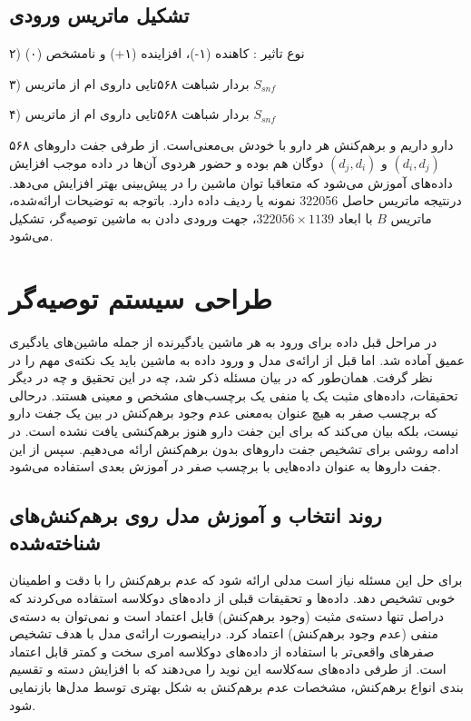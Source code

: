 \subsection{تشکیل ماتریس ورودی}

۲) نوع تاثیر : کاهنده (۱-)، افزاینده (۱+) و نامشخص (۰)

۳) بردار شباهت ۵۶۸تایی داروی
ام از ماتریس
$S_{snf}$

۴) بردار شباهت ۵۶۸تایی داروی
ام از ماتریس
$S_{snf}$

۵۶۸ دارو داریم و برهم‌کنش هر دارو با خودش بی‌معنی‌است. از طرفی جفت داروهای 
$(d_i, d_j)$
و 
$(d_j, d_i)$
دوگان هم بوده و حضور هردوی آن‌ها در داده موجب افزایش داده‌های آموزش می‌شود که متعاقبا توان ماشین را در پیش‌بینی بهتر افزایش می‌دهد. درنتیجه ماتریس حاصل 322056 نمونه یا ردیف داده دارد. باتوجه به توضیحات ارائه‌شده، ماتریس 
$B$
با ابعاد 
$322056 \times 1139$،
جهت ورودی دادن به ماشین توصیه‌گر، تشکیل می‌شود.


\section{
طراحی سیستم توصیه‌گر
\label{RecomDesign}}

در مراحل قبل داده برای ورود به هر ماشین یادگیرنده از جمله ماشین‌های یادگیری عمیق آماده شد. اما قبل از ارائه‌ی مدل و ورود داده به ماشین باید یک نکته‌ی مهم را در نظر گرفت. همان‌طور که در بیان مسئله ذکر شد، چه در این تحقیق و چه در دیگر تحقیقات، داده‌های مثبت یک یا منفی یک برچسب‌های مشخص و معینی هستند. درحالی که برچسب صفر به هیچ عنوان به‌معنی عدم وجود برهم‌کنش در بین یک جفت دارو نیست، بلکه بیان می‌کند که برای این جفت دارو هنوز برهم‌کنشی یافت نشده ‌است. در ادامه روشی برای تشخیص جفت داروهای بدون برهم‌کنش ارائه می‌دهیم. سپس از این جفت داروها به عنوان داده‌هایی با برچسب صفر در آموزش بعدی استفاده می‌شود.

\subsection{روند انتخاب و آموزش مدل روی برهم‌کنش‌های شناخته‌شده}

برای حل این مسئله نیاز است مدلی ارائه شود که عدم برهم‌کنش را با دقت و اطمینان خوبی تشخیص دهد. داده‌ها و تحقیقات قبلی از داده‌های دوکلاسه استفاده می‌کردند که دراصل تنها دسته‌ی مثبت (وجود برهم‌کنش) قابل اعتماد است و نمی‌توان به دسته‌ی منفی (عدم وجود برهم‌کنش) اعتماد کرد. دراینصورت ارائه‌ی مدل با هدف تشخیص صفرهای واقعی‌تر با استفاده از داده‌های دوکلاسه امری سخت و کمتر قابل اعتماد است. از طرفی داده‌های سه‌کلاسه این نوید را می‌دهند که با افزایش دسته‌ و تقسیم بندی انواع برهم‌کنش، مشخصات عدم بر‌هم‌کنش به شکل بهتری توسط مدل‌ها بازنمایی شود.


